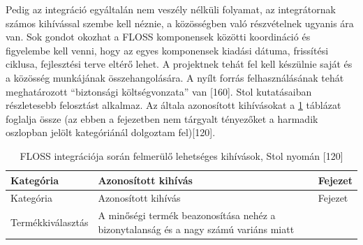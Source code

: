 \documentclass[12pt,magyar,a4paper,oneside]{scrreprt}
\begin{document}
Pedig az integráció egyáltalán nem veszély nélküli folyamat, az
integrátornak számos kihívással szembe kell néznie, a közösségben való
részvételnek ugyanis ára van. Sok gondot okozhat a FLOSS komponensek
közötti koordináció és figyelembe kell venni, hogy az egyes komponensek
kiadási dátuma, frissítési ciklusa, fejlesztési terve eltérő lehet. A
projektnek tehát fel kell készülnie saját és a közösség munkájának
összehangolására. A nyílt forrás felhasználásának tehát meghatározott
``biztonsági költségvonzata'' van {[}160{]}. Stol kutatásaiban
részletesebb felosztást alkalmaz. Az általa azonosított kihívásokat a
\ref{tbl:IntKih} táblázat foglalja össze (az ebben a fejezetben nem
tárgyalt tényezőket a harmadik oszlopban jelölt kategóriánál dolgoztam
fel){[}120{]}.

\hypertarget{tbl:IntKih}{}
\begin{longtable}[]{@{}lll@{}}
\caption{\label{tbl:IntKih}FLOSS integrációja során felmerülő lehetséges
kihívások, Stol nyomán {[}120{]}}\tabularnewline
\toprule
\begin{minipage}[b]{0.24\columnwidth}\raggedright
Kategória\strut
\end{minipage} & \begin{minipage}[b]{0.49\columnwidth}\raggedright
Azonosított kihívás\strut
\end{minipage} & \begin{minipage}[b]{0.18\columnwidth}\raggedright
Fejezet\strut
\end{minipage}\tabularnewline
\midrule
\endfirsthead
\toprule
\begin{minipage}[b]{0.24\columnwidth}\raggedright
Kategória\strut
\end{minipage} & \begin{minipage}[b]{0.49\columnwidth}\raggedright
Azonosított kihívás\strut
\end{minipage} & \begin{minipage}[b]{0.18\columnwidth}\raggedright
Fejezet\strut
\end{minipage}\tabularnewline
\midrule
\endhead
\begin{minipage}[t]{0.24\columnwidth}\raggedright
Termékkiválasztás\strut
\end{minipage} & \begin{minipage}[t]{0.49\columnwidth}\raggedright
A minőségi termék beazonosítása nehéz a bizonytalanság és a nagy számú
variáns miatt\strut
\end{minipage} & \begin{minipage}[t]{0.18\columnwidth}\raggedright

\end{minipage}
\end{longtable}
\end{document}
